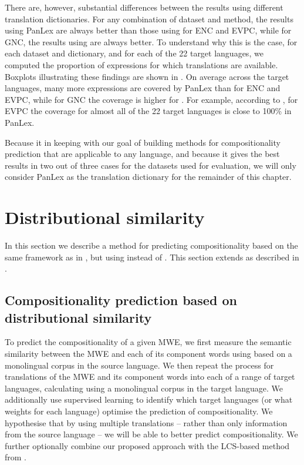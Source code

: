 \documentclass[output=paper,modfonts,nonflat]{langsci/langscibook}
\begin{document}
There are, however, substantial differences between the results using
different translation dictionaries. For any combination of dataset and
method, the results using PanLex are always better than those using
\dictcc for ENC and EVPC, while for GNC, the results using \dictcc are
always better. To understand why this is the case, for each dataset 
and dictionary, and for each of the 22 target languages, we computed the 
proportion of expressions for which translations are
available. Boxplots illustrating these findings are shown in
. On average across the target languages,
many more expressions are covered by PanLex than \dictcc for ENC and
EVPC, while for GNC the coverage is higher for \dictcc. For example,
according to , for EVPC the coverage for
almost all of the 22 target languages is close to 100\% in PanLex.

Because it in keeping with our goal of building methods for
compositionality prediction that are applicable to any language, and
because it gives the best results in two out of three cases for the
datasets used for evaluation, we will only consider PanLex as the
translation dictionary for the remainder of this chapter.


\section{Distributional similarity\label{sec:distsim}}

In this section we describe a method for predicting compositionality
based on the same framework as in , but using
 instead of . This section
extends \cite{DBLP:conf/eacl/SalehiCB14} as described in
.

\subsection{Compositionality prediction based on distributional similarity\label{sec:distsimmodel}}

To predict the compositionality of a given MWE, we first measure the
semantic similarity between the MWE and each of its component words
using  based on a monolingual corpus in the
source language.  We then repeat the process for translations of the
MWE and its component words into each of a range of target languages,
calculating  using a monolingual corpus in
the target language. We additionally use supervised learning to
identify which target languages (or what weights for each language)
optimise the prediction of compositionality. We hypothesise that by
using multiple translations -- rather than only information from the
source language -- we will be able to better predict
compositionality. We further optionally combine our proposed approach
with the LCS-based  method from
.
\end{document}

